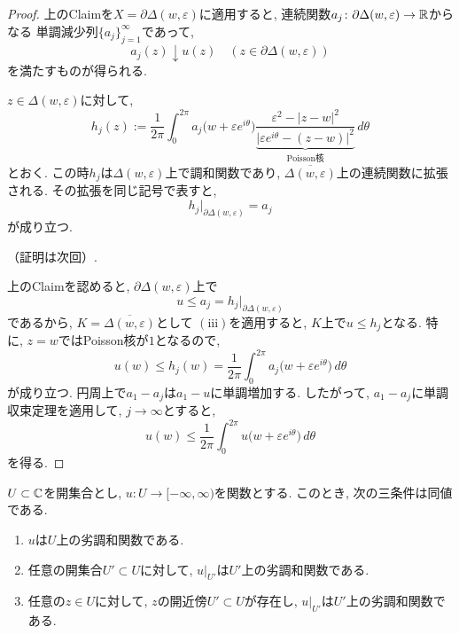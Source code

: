 \begin{proof}
上のClaimを$X=\partial\Delta(w,\varepsilon)$に適用すると,
連続関数$a_j \colon \partial\Delta(w,\varepsilon) \to \mathbb{R}$からなる
単調減少列$\{a_j\}_{j=1}^{\infty}$であって,
\[
a_j(z) \downarrow u(z)
\quad
(z \in \partial\Delta(w,\varepsilon))
\]
を満たすものが得られる.

\begin{tcolorbox}[mybox]
\begin{claim}
$z \in \Delta(w,\varepsilon)$に対して,
\[
h_j(z)
:=
\frac{1}{2\pi}
\int_0^{2\pi}
a_j\bigl(w+\varepsilon e^{i\theta}\bigr)
\underbrace{
\frac{\varepsilon^2-|z-w|^2}
{\bigl|\varepsilon e^{i\theta}-(z-w)\bigr|^2}
}_{\text{Poisson核}}
\,d\theta
\]
とおく.
この時$h_j$は$\Delta(w,\varepsilon)$上で調和関数であり,
$\overline{\Delta(w,\varepsilon)}$上の連続関数に拡張される.
その拡張を同じ記号で表すと,
\[
h_j|_{\partial\Delta(w,\varepsilon)}=a_j
\]
が成り立つ.
\end{claim}
\end{tcolorbox}
（証明は次回）.

上のClaimを認めると,
$\partial\Delta(w,\varepsilon)$上で
\[
u \leq a_j=h_j|_{\partial\Delta(w,\varepsilon)}
\]
であるから, $K=\overline{\Delta(w,\varepsilon)}$として
$\mathrm{(iii)}$を適用すると,
$K$上で$u \leq h_j$となる.
特に, $z=w$ではPoisson核が$1$となるので,
\[
u(w)
\leq h_j(w)
=
\frac{1}{2\pi}
\int_0^{2\pi}
a_j\bigl(w+\varepsilon e^{i\theta}\bigr)\,d\theta
\]
が成り立つ.
円周上で$a_1-a_j$は$a_1-u$に単調増加する.
したがって, $a_1-a_j$に単調収束定理を適用して,
$j \to \infty$とすると,
\[
u(w)
\leq
\frac{1}{2\pi}
\int_0^{2\pi}
u\bigl(w+\varepsilon e^{i\theta}\bigr)\,d\theta
\]
を得る.
\end{proof}

\begin{tcolorbox}[mybox]
\begin{cor}
$U \subset \mathbb{C}$を開集合とし,
$u \colon U \to [-\infty,\infty)$を関数とする.
このとき, 次の三条件は同値である.

\begin{enumerate}[label=(\roman*)]
\item
$u$は$U$上の劣調和関数である.

\item
任意の開集合$U' \subset U$に対して,
$u|_{U'}$は$U'$上の劣調和関数である.

\item
任意の$z \in U$に対して,
$z$の開近傍$U' \subset U$が存在し,
$u|_{U'}$は$U'$上の劣調和関数である.
\end{enumerate}
\end{cor}
\end{tcolorbox}

